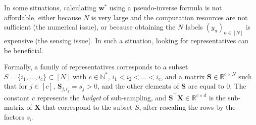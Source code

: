 \documentclass[twoside,11pt]{book}
\numberwithin{theorem}{chapter}
\numberwithin{definition}{chapter}
\numberwithin{proposition}{chapter}
\numberwithin{corollary}{chapter}
\numberwithin{example}{chapter}
\numberwithin{lemma}{chapter}
\numberwithin{assumption}{chapter}
\numberwithin{equation}{chapter}
\numberwithin{figure}{chapter}
\DeclareMathOperator{\Tran}{\intercal}
\begin{document}
In some situations, calculating $\bm{w}^{*}$ using a pseudo-inverse formula is not affordable, either because $N$ is very large and the computation resources are not sufficient (the numerical issue), or because obtaining the $N$ labels $(y_{n})_{n \in [N]}$ is expensive (the sensing issue). In such a situation, looking for representatives can be beneficial.

 Formally, a family of representatives 
 corresponds to a subset $S = \{i_{1}, \dots, i_{c} \} \subset [N]$ with $c \in \mathbb{N}^{*}$, $i_{1} < i_{2} < \dots < i_{c}$, and a matrix $\bm{S} \in \mathbb{R}^{c \times N}$ such that for $j \in [c]$, 
 $\bm{S}_{j,i_{j}}  = s_{j}>0$, and the other elements of $\bm{S}$ are equal to $0$. The constant $c$ represents the \emph{budget} of sub-sampling,
  and $\bm{S}^{\Tran}\bm{X} \in \mathbb{R}^{c \times d}$ is the sub-matrix of $\bm{X}$ that correspond to the subset $S$, after rescaling the rows by the factors $s_{i}$.
\end{document}
